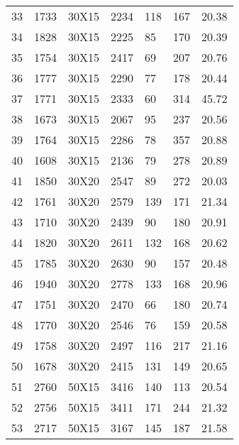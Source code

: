 \documentclass[14pt]{acmsiggraph}
\begin{document}
\begin{table}[h!]
\begin{center}
{\begin{tabular}{lllllll||}
					33  & 1733 & 30X15  & \cellcolor[rgb]{0.76,0.81,0.41}2234 & 118 & 167  & 20.38 \\
					34  & 1828 & 30X15  & \cellcolor[rgb]{0.68,0.78,0.38}2225 & 85  & 170  & 20.39 \\
					35  & 1754 & 30X15  & \cellcolor[rgb]{0.86,0.85,0.45}2417 & 69  & 207  & 20.76 \\
					36  & 1777 & 30X15  & \cellcolor[rgb]{0.76,0.81,0.41}2290 & 77  & 178  & 20.44 \\
					37  & 1771 & 30X15  & \cellcolor[rgb]{0.79,0.83,0.42}2333 & 60  & 314  & 45.72 \\
					38  & 1673 & 30X15  & \cellcolor[rgb]{0.7,0.79,0.38}2067  & 95  & 237  & 20.56 \\
					39  & 1764 & 30X15  & \cellcolor[rgb]{0.76,0.81,0.41}2286 & 78  & 357  & 20.88 \\
					40  & 1608 & 30X15  & \cellcolor[rgb]{0.8,0.83,0.43}2136  & 79  & 278  & 20.89 \\
					41  & 1850 & 30X20  & \cellcolor[rgb]{0.85,0.85,0.45}2547 & 89  & 272  & 20.03 \\
					42  & 1761 & 30X20  & \cellcolor[rgb]{0.95,0.9,0.49}2579  & 139 & 171  & 21.34 \\
					43  & 1710 & 30X20  & \cellcolor[rgb]{0.91,0.88,0.48}2439 & 90  & 180  & 20.91 \\
					44  & 1820 & 30X20  & \cellcolor[rgb]{0.92,0.88,0.48}2611 & 132 & 168  & 20.62 \\
					45  & 1785 & 30X20  & \cellcolor[rgb]{0.96,0.9,0.5}2630   & 90  & 157  & 20.48 \\
					46  & 1940 & 30X20  & \cellcolor[rgb]{0.92,0.88,0.48}2778 & 133 & 168  & 20.96 \\
					47  & 1751 & 30X20  & \cellcolor[rgb]{0.89,0.87,0.47}2470 & 66  & 180  & 20.74 \\
					48  & 1770 & 30X20  & \cellcolor[rgb]{0.92,0.89,0.48}2546 & 76  & 159  & 20.58 \\
					49  & 1758 & 30X20  & \cellcolor[rgb]{0.9,0.88,0.47}2497  & 116 & 217  & 21.16 \\
					50  & 1678 & 30X20  & \cellcolor[rgb]{0.92,0.89,0.48}2415 & 131 & 149  & 20.65 \\
					51  & 2760 & 50X15  & \cellcolor[rgb]{0.7,0.79,0.38}3416  & 140 & 113  & 20.54 \\
					52  & 2756 & 50X15  & \cellcolor[rgb]{0.7,0.79,0.38}3411  & 171 & 244  & 21.32 \\
					53  & 2717 & 50X15  & \cellcolor[rgb]{0.62,0.75,0.35}3167 & 145 & 187  & 21.58 \\

\end{tabular}}
\end{center}
\end{table}
\end{document}
